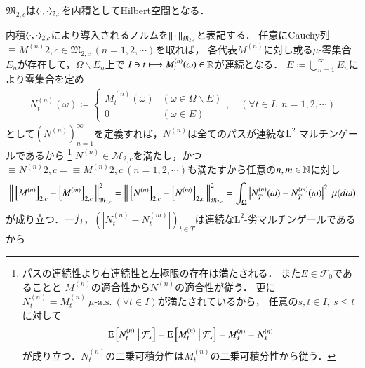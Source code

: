 	\begin{screen}
		\begin{thm}
			$\mathfrak{M}_{2,c}$は$\inprod<\cdot,\cdot>_{2,c}$を内積としてHilbert空間となる．
			\label{prp:M_2_c_hilbert}
		\end{thm}
	\end{screen}
			
	\begin{prf}
			内積$\inprod<\cdot,\cdot>_{2,c}$により導入されるノルムを$\left\|\, \cdot\, \right\|_{\mathfrak{M}_{2,c}}$と表記する．
			任意にCauchy列$\equiv{M^{(n)}}{2,c} \in \mathfrak{M}_{2,c}\ (n=1,2,\cdots)$を取れば，
			各代表$M^{(n)}$に対し或る$\mu$-零集合$E_n$が存在して，$\Omega \backslash E_n$上で
			$I \ni t \longmapsto M^{(n)}_t(\omega) \in \mathbb{R}$が連続となる．
			$E \coloneqq \bigcup_{n=1}^{\infty} E_n$により零集合を定め
			\begin{align}
				N^{(n)}_t(\omega) \coloneqq
				\begin{cases}
					M^{(n)}_t(\omega) & (\omega \in \Omega \backslash E) \\
					0 & (\omega \in E)
				\end{cases}
				,\quad (\forall t \in I,\ n = 1,2,\cdots)
			\end{align}
		として$\left( N^{(n)} \right)_{n=1}^{\infty}$を定義すれば，$N^{(n)}$は全てのパスが連続な$\mathrm{L}^2$-マルチンゲールであるから
		\footnote{
			パスの連続性より右連続性と左極限の存在は満たされる．
			また$E \in \mathcal{F}_0$であることと
			$M^{(n)}$の適合性から$N^{(n)}$の適合性が従う．
			更に$N^{(n)}_t = M^{(n)}_t\ \mbox{$\mu$-a.s.}\ (\forall t \in I)$が満たされているから，
			任意の$s,t \in I,\ s \leq t$に対して
			\begin{align}
				\operatorname{E} \left[ N^{(n)}_t \ \middle|\ \mathcal{F}_s \right] = \operatorname{E} \left[ M^{(n)}_t \ \middle|\ \mathcal{F}_s \right] = M^{(n)}_s = N^{(n)}_s
			\end{align}
			が成り立つ．$N^{(n)}_t$の二乗可積分性は$M^{(n)}_t$の二乗可積分性から従う．
		}
		$N^{(n)} \in \mathcal{M}_{2,c}$を満たし，かつ
		$\equiv{N^{(n)}}{2,c} = \equiv{M^{(n)}}{2,c}\ (n=1,2,\cdots)$も満たすから任意の$n,m \in \mathbb{N}$に対し
		\begin{align}
			\left\|\, \left[M^{(n)}\right]_{2,c} - \left[M^{(m)}\right]_{2,c}\, \right\|_{\mathfrak{M}_{2,c}}^2 
			= \left\|\, \left[N^{(n)}\right]_{2,c} - \left[N^{(m)}\right]_{2,c}\, \right\|_{\mathfrak{M}_{2,c}}^2
			= \int_{\Omega} \left| N^{(n)}_T(\omega) - N^{(m)}_T(\omega) \right|^2\ \mu(d\omega)
			\label{eq:prp_M_2_c_hilbert_1}
		\end{align}
		が成り立つ．一方，$\left(\left|N^{(n)}_t - N^{(m)}_t\right|\right)_{t \in T}$は連続な$\mathrm{L}^2$-劣マルチンゲールであるから

\end{prf}
